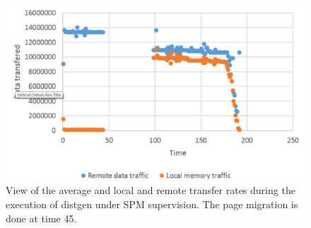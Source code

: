 \begin{figure}[th]
	\centering
		\includegraphics[width=.8\textwidth]{figures/at-transfer-random.eps}
		\caption{View of the average and local and remote transfer rates during the execution of distgen under SPM supervision. The page migration is done at time 45.}
		\label{fig:at-spmactn-trsfer}
\end{figure}